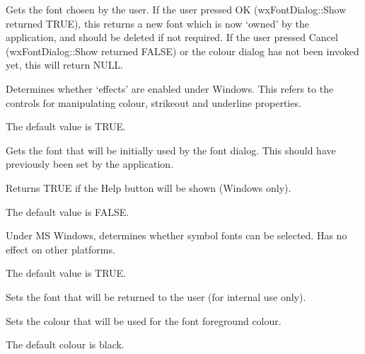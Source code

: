 
Gets the font chosen by the user. If the user pressed OK (wxFontDialog::Show returned TRUE), this returns
a new font which is now `owned' by the application, and should be deleted
if not required. If the user pressed Cancel (wxFontDialog::Show returned FALSE) or
the colour dialog has not been invoked yet, this will return NULL.



Determines whether `effects' are enabled under Windows. This refers to the
controls for manipulating colour, strikeout and underline properties.

The default value is TRUE.



Gets the font that will be initially used by the font dialog. This should have
previously been set by the application.



Returns TRUE if the Help button will be shown (Windows only).

The default value is FALSE.



Under MS Windows, determines whether symbol fonts can be selected. Has no
effect on other platforms.

The default value is TRUE.



Sets the font that will be returned to the user (for internal use only).



Sets the colour that will be used for the font foreground colour.

The default colour is black.


